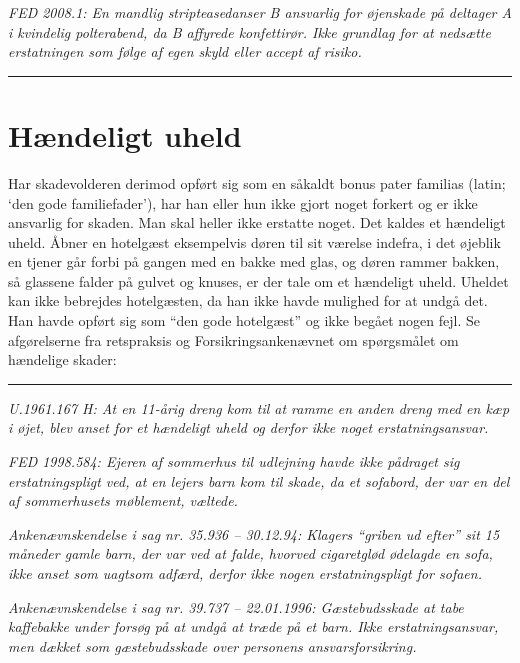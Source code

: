 \documentclass[]{book}
\begin{document}
\emph{FED 2008.1: En mandlig stripteasedanser B ansvarlig for øjenskade på deltager A i kvindelig polterabend, da B affyrede konfettirør. Ikke grundlag for at nedsætte erstatningen som følge af egen skyld eller accept af risiko.}

\begin{center}\rule{0.5\linewidth}{\linethickness}\end{center}

\hypertarget{hndeligt-uheld}{%
\section{Hændeligt uheld}\label{hndeligt-uheld}}

Har skadevolderen derimod opført sig som en såkaldt bonus pater familias (latin; `den gode familiefader'), har han eller hun ikke gjort noget forkert og er ikke ansvarlig for skaden. Man skal heller ikke erstatte noget. Det kaldes et hændeligt uheld. Åbner en hotelgæst eksempelvis døren til sit værelse indefra, i det øjeblik en tjener går forbi på gangen med en bakke med glas, og døren rammer bakken, så glassene falder på gulvet og knuses, er der tale om et hændeligt uheld. Uheldet kan ikke bebrejdes hotelgæsten, da han ikke havde mulighed for at undgå det. Han havde opført sig som ``den gode hotelgæst'' og ikke begået nogen fejl. Se afgørelserne fra retspraksis og Forsikringsankenævnet om spørgsmålet om hændelige skader:

\begin{center}\rule{0.5\linewidth}{\linethickness}\end{center}

\emph{U.1961.167 H: At en 11-årig dreng kom til at ramme en anden dreng med en kæp i øjet, blev anset for et hændeligt uheld og derfor ikke noget erstatningsansvar.}

\emph{FED 1998.584: Ejeren af sommerhus til udlejning havde ikke pådraget sig erstatningspligt ved, at en lejers barn kom til skade, da et sofabord, der var en del af sommerhusets møblement, væltede.}

\emph{Ankenævnskendelse i sag nr. 35.936 -- 30.12.94: Klagers ``griben ud efter'' sit 15 måneder gamle barn, der var ved at falde, hvorved cigaretglød ødelagde en sofa, ikke anset som uagtsom adfærd, derfor ikke nogen erstatningspligt for sofaen.}

\emph{Ankenævnskendelse i sag nr. 39.737 -- 22.01.1996: Gæstebudsskade at tabe kaffebakke under forsøg på at undgå at træde på et barn. Ikke erstatningsansvar, men dækket som gæstebudsskade over personens ansvarsforsikring.}
\end{document}
